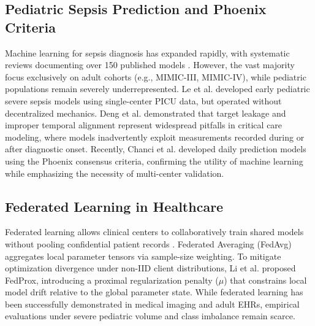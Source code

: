 \documentclass[runningheads]{llncs}
\begin{document}
\subsection{Pediatric Sepsis Prediction and Phoenix Criteria}
Machine learning for sepsis diagnosis has expanded rapidly, with systematic reviews documenting over 150 published models \cite{fleuren2020ml,yang2023sepsis}. However, the vast majority focus exclusively on adult cohorts (e.g., MIMIC-III, MIMIC-IV), while pediatric populations remain severely underrepresented. Le et al. \cite{le2019pediatric} developed early pediatric severe sepsis models using single-center PICU data, but operated without decentralized mechanics. Deng et al. \cite{deng2022evaluating} demonstrated that target leakage and improper temporal alignment represent widespread pitfalls in critical care modeling, where models inadvertently exploit measurements recorded during or after diagnostic onset. Recently, Chanci et al. \cite{chanci2025machine} developed daily prediction models using the Phoenix consensus criteria, confirming the utility of machine learning while emphasizing the necessity of multi-center validation.

\subsection{Federated Learning in Healthcare}
Federated learning allows clinical centers to collaboratively train shared models without pooling confidential patient records \cite{mcmahan2017fedavg}. Federated Averaging (FedAvg) aggregates local parameter tensors via sample-size weighting. To mitigate optimization divergence under non-IID client distributions, Li et al. \cite{li2020fedprox} proposed FedProx, introducing a proximal regularization penalty ($\mu$) that constrains local model drift relative to the global parameter state. While federated learning has been successfully demonstrated in medical imaging and adult EHRs, empirical evaluations under severe pediatric volume and class imbalance remain scarce.
\end{document}

